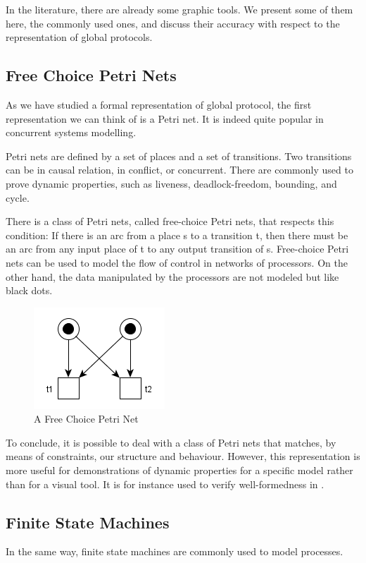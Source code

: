 \documentclass[a4paper,11pt,twoside]{report}
\begin{document}
In the literature, there are already some graphic tools. We present some of them here, the commonly used ones, and discuss their accuracy with respect to the representation of global protocols.

\subsection{Free Choice Petri Nets}
As we have studied a formal representation of global protocol, the first representation we can think of is a Petri net. It is indeed quite popular in concurrent systems modelling.

Petri nets are defined by a set of places and a set of transitions. Two transitions can be in causal relation, in conflict, or concurrent. There are commonly used to prove dynamic properties, such as liveness, deadlock-freedom, bounding, and cycle.

There is a class of Petri nets, called free-choice Petri nets, that respects this condition: If there is an arc from a place s to a transition t, then there must be an arc from any input place of t to any output transition of s. Free-choice Petri nets can be used to model the flow of control in networks of processors. On the other hand, the data manipulated by the processors are not modeled but like black dots.

\begin{figure}[h]
\begin{center}
\includegraphics[scale=0.5]{freechoicepetrinets}
\end{center}
\caption{A Free Choice Petri Net}
\end{figure}

To conclude, it is possible to deal with a class of Petri nets that matches, by means of constraints, our structure and behaviour. However, this representation is more useful for demonstrations of dynamic properties for a specific model rather than for a visual tool. It is for instance used to verify well-formedness in \cite{denielou2012multiparty}.

\subsection{Finite State Machines}
In the same way, finite state machines are commonly used to model processes.
\end{document}
